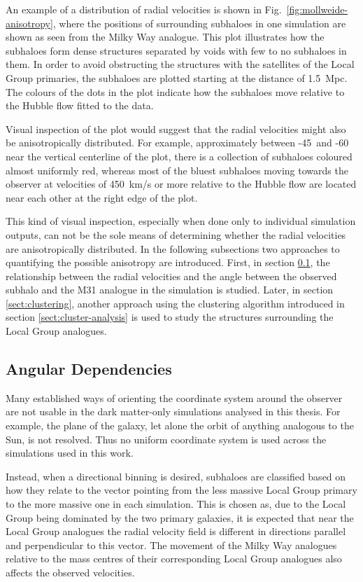 \documentclass[english, twoside]{HYgradu}
\begin{document}
An example of a distribution of radial velocities is shown in Fig.~\ref{fig:mollweide-anisotropy}, where the positions of surrounding subhaloes in one simulation are shown as seen from the Milky Way analogue. This plot illustrates how the subhaloes form dense structures separated by voids with few to no subhaloes in them. In order to avoid obstructing the structures with the satellites of the Local Group primaries, the subhaloes are plotted starting at the distance of 1.5~Mpc. The colours of the dots in the plot indicate how the subhaloes move relative to the Hubble flow fitted to the data.

Visual inspection of the plot would suggest that the radial velocities might also be anisotropically distributed. For example, approximately between -45\textdegree\ and -60\textdegree\, near the vertical centerline of the plot, there is a collection of subhaloes coloured almost uniformly red, whereas most of the bluest subhaloes moving towards the observer at velocities of 450~km/s or more relative to the Hubble flow are located near each other at the right edge of the plot.

This kind of visual inspection, especially when done only to individual simulation outputs, can not be the sole means of determining whether the radial velocities are anisotropically distributed. In the following subsections two approaches to quantifying the possible anisotropy are introduced. First, in section \ref{sect:angular-dependencies}, the relationship between the radial velocities and the angle between the observed subhalo and the M31 analogue in the simulation is studied. Later, in section \ref{sect:clustering}, another approach using the clustering algorithm introduced in section \ref{sect:cluster-analysis} is used to study the structures surrounding the Local Group analogues.

\subsection{Angular Dependencies}\label{sect:angular-dependencies}
Many established ways of orienting the coordinate system around the observer are not usable in the dark matter-only simulations analysed in this thesis. For example, the plane of the galaxy, let alone the orbit of anything analogous to the Sun, is not resolved. Thus no uniform coordinate system is used across the simulations used in this work.

Instead, when a directional binning is desired, subhaloes are classified based on how they relate to the vector pointing from the less massive Local Group primary to the more massive one in each simulation. This is chosen as, due to the Local Group being dominated by the two primary galaxies, it is expected that near the Local Group analogues the radial velocity field is different in directions parallel and perpendicular to this vector. The movement of the Milky Way analogues relative to the mass centres of their corresponding Local Group analogues also affects the observed velocities.
\end{document}
